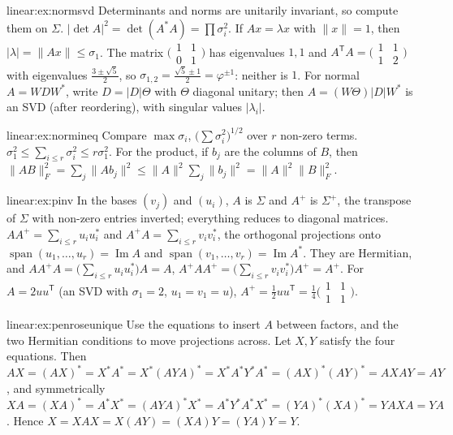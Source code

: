 \begin{solution}{linear:ex:normsvd}
\idea Determinants and norms are unitarily invariant, so compute them on $\Sigma$.
\writeup $|\det A|^2=\det(A^*A)=\prod\sigma_i^2$. If $Ax=\lambda x$ with $\|x\|=1$, then $|\lambda|=\|Ax\|\le\sigma_1$. The matrix
$\bigl(\begin{smallmatrix}1&1\\0&1\end{smallmatrix}\bigr)$ has eigenvalues $1,1$ and $A^{\mathsf T}A=\bigl(\begin{smallmatrix}1&1\\1&2
\end{smallmatrix}\bigr)$ with eigenvalues $\frac{3\pm\sqrt5}2$, so $\sigma_{1,2}=\frac{\sqrt5\pm1}2=\varphi^{\pm1}$: neither
is $1$. For normal $A=WDW^*$, write $D=|D|\Theta$ with $\Theta$ diagonal unitary; then $A=(W\Theta)|D|W^*$ is an SVD (after
reordering), with singular values $|\lambda_i|$.
\end{solution}

\begin{solution}{linear:ex:normineq}
\idea Compare $\max\sigma_i$, $\bigl(\sum\sigma_i^2\bigr)^{1/2}$ over $r$ non-zero terms.
\writeup $\sigma_1^2\le\sum_{i\le r}\sigma_i^2\le r\sigma_1^2$. For the product, if $b_j$ are the columns of $B$, then
$\|AB\|_F^2=\sum_j\|Ab_j\|^2\le\|A\|^2\sum_j\|b_j\|^2=\|A\|^2\|B\|_F^2$.
\end{solution}

\begin{solution}{linear:ex:pinv}
\idea In the bases $(v_j)$ and $(u_i)$, $A$ is $\Sigma$ and $A^+$ is $\Sigma^+$, the transpose of $\Sigma$ with non-zero entries
inverted; everything reduces to diagonal matrices.
\writeup $AA^+=\sum_{i\le r}u_iu_i^*$ and $A^+A=\sum_{i\le r}v_iv_i^*$, the orthogonal projections onto $\operatorname{span}
(u_1,\dots,u_r)=\operatorname{Im}A$ and $\operatorname{span}(v_1,\dots,v_r)=\operatorname{Im}A^*$. They are Hermitian, and
$AA^+A=\bigl(\sum_{i\le r}u_iu_i^*\bigr)A=A$, $A^+AA^+=\bigl(\sum_{i\le r}v_iv_i^*\bigr)A^+=A^+$. For $A=2uu^{\mathsf T}$ (an SVD
with $\sigma_1=2$, $u_1=v_1=u$), $A^+=\frac12uu^{\mathsf T}=\frac14\bigl(\begin{smallmatrix}1&1\\1&1\end{smallmatrix}\bigr)$.
\end{solution}

\begin{solution}{linear:ex:penroseunique}
\idea Use the equations to insert $A$ between factors, and the two Hermitian conditions to move projections across.
\writeup Let $X,Y$ satisfy the four equations. Then $AX=(AX)^*=X^*A^*=X^*(AYA)^*=X^*A^*Y^*A^*=(AX)^*(AY)^*=AXAY=AY$, and
symmetrically $XA=(XA)^*=A^*X^*=(AYA)^*X^*=A^*Y^*A^*X^*=(YA)^*(XA)^*=YAXA=YA$. Hence $X=XAX=X(AY)=(XA)Y=(YA)Y=Y$.
\end{solution}


